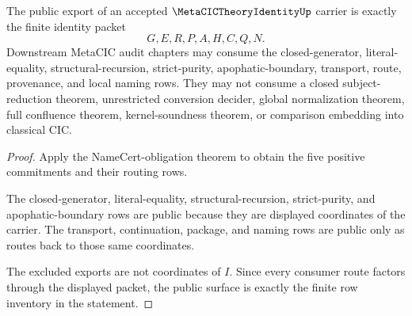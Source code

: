 \begin{theorem}
\label{thm:metacic-theory-identity-public-export-boundary}
The public export of an accepted $\MetaCICTheoryIdentityUp$ carrier is exactly the finite identity packet
$$
G,E,R,P,A,H,C,Q,N.
$$
Downstream MetaCIC audit chapters may consume the closed-generator, literal-equality, structural-recursion, strict-purity, apophatic-boundary, transport, route, provenance, and local naming rows. They may not consume a closed subject-reduction theorem, unrestricted conversion decider, global normalization theorem, full confluence theorem, kernel-soundness theorem, or comparison embedding into classical CIC.
\end{theorem}
\begin{proof}
Apply the NameCert-obligation theorem to obtain the five positive commitments and their routing rows.

The closed-generator, literal-equality, structural-recursion, strict-purity, and apophatic-boundary rows are public because they are displayed coordinates of the carrier. The transport, continuation, package, and naming rows are public only as routes back to those same coordinates.

The excluded exports are not coordinates of $I$. Since every consumer route factors through the displayed packet, the public surface is exactly the finite row inventory in the statement.
\end{proof}

\begin{closurestatus}{\MetaCICTheoryIdentityUp}
  \theoryclosure{\obligationClosure}
  \formalstatus{\unformalizedV}
\end{closurestatus}
